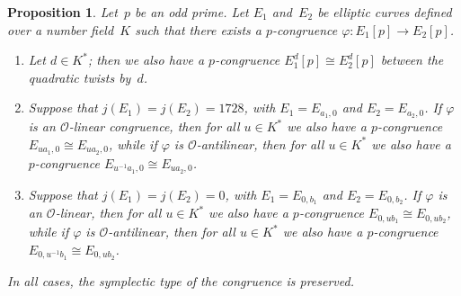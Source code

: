 \documentclass[12pt, reqno]{amsart}
\newcommand{\calO}{\mathcal{O}}
\numberwithin{equation}{section}
\newtheorem{proposition}[theorem]{Proposition}
\theoremstyle{definition}
\theoremstyle{remark}
\begin{document}
\begin{proposition}\label{P:twist-cong}
Let~$p$ be an odd prime.  Let $E_1$ and~$E_2$ be elliptic curves
defined over a number field~$K$ such that there exists a
$p$-congruence $\varphi:E_1[p]\to E_2[p]$.
\begin{enumerate}
\item
  Let $d\in K^*$; then we also have a $p$-congruence $E_1^d[p]\cong
  E_2^d[p]$ between the quadratic twists by~$d$.
\item
  Suppose that $j(E_1)=j(E_2)=1728$, with $E_1=E_{a_1,0}$ and
  $E_2=E_{a_2,0}$.  If $\varphi$ is an $\calO$-linear congruence, then
  for all $u\in K^*$ we also have a $p$-congruence $E_{ua_1,0}\cong
  E_{ua_2,0}$, while if $\varphi$ is $\calO$-antilinear, then for all
  $u\in K^*$ we also have a $p$-congruence $E_{u^{-1}a_1,0}\cong
  E_{ua_2,0}$.
\item
  Suppose that $j(E_1)=j(E_2)=0$, with $E_1=E_{0,b_1}$ and
  $E_2=E_{0,b_2}$.  If $\varphi$ is an $\calO$-linear, then for all
  $u\in K^*$ we also have a $p$-congruence $E_{0,ub_1}\cong
  E_{0,ub_2}$, while if $\varphi$ is $\calO$-antilinear, then for all
  $u\in K^*$ we also have a $p$-congruence $E_{0,u^{-1}b_1}\cong
  E_{0,ub_2}$.
\end{enumerate}
In all cases, the symplectic type of the congruence is preserved.
\end{proposition}
\end{document}
